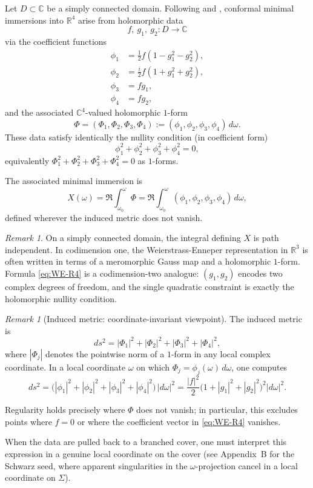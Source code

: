 \documentclass[12pt]{article}
\numberwithin{equation}{section}
\theoremstyle{definition}
\theoremstyle{remark}
\newtheorem{remark}[theorem]{Remark}
\begin{document}
Let $D\subset\mathbb{C}$ be a simply connected domain.
Following \cite{TodaGulerRn} and \cite{TodaGulerR4}, conformal minimal immersions into $\mathbb{R}^4$ arise from holomorphic data
\[
f,\ g_1,\ g_2 : D \longrightarrow \mathbb{C}
\]
via the coefficient functions
\begin{equation}\label{eq:WE-R4}
\begin{aligned}
\phi_1 &= \frac12 f(1 - g_1^2 - g_2^2),\\
\phi_2 &= \frac{i}{2} f(1 + g_1^2 + g_2^2),\\
\phi_3 &= f g_1,\\
\phi_4 &= f g_2 ,
\end{aligned}
\end{equation}
and the associated $\mathbb{C}^4$-valued holomorphic $1$-form
\[
\Phi = (\Phi_1,\Phi_2,\Phi_3,\Phi_4):=(\phi_1,\phi_2,\phi_3,\phi_4)\,d\omega.
\]
These data satisfy identically the nullity condition (in coefficient form)
\[
\phi_1^2+\phi_2^2+\phi_3^2+\phi_4^2=0,
\]
equivalently $\Phi_1^2+\Phi_2^2+\Phi_3^2+\Phi_4^2=0$ as $1$-forms.

The associated minimal immersion is
\[
X(\omega)=\Re\int_{\omega_0}^{\omega}\Phi
=\Re\int_{\omega_0}^{\omega}(\phi_1,\phi_2,\phi_3,\phi_4)\,d\omega,
\]
defined wherever the induced metric does not vanish.

\begin{remark}
On a simply connected domain, the integral defining $X$ is path independent.
In codimension one, the Weierstrass-Enneper representation in $\mathbb{R}^3$ is often written in terms of a meromorphic Gauss map and a holomorphic $1$-form.
Formula \eqref{eq:WE-R4} is a codimension-two analogue: $(g_1,g_2)$ encodes two complex degrees of freedom, and the single quadratic constraint is exactly the holomorphic nullity condition.
\end{remark}

\begin{remark}[Induced metric: coordinate-invariant viewpoint]
The induced metric is
\[
ds^2=|\Phi_1|^2+|\Phi_2|^2+|\Phi_3|^2+|\Phi_4|^2,
\]
where $|\Phi_j|$ denotes the pointwise norm of a $1$-form in any local complex coordinate.
In a local coordinate $\omega$ on which $\Phi_j=\phi_j(\omega)\,d\omega$, one computes
\[
ds^2=\bigl(|\phi_1|^2+|\phi_2|^2+|\phi_3|^2+|\phi_4|^2\bigr)\,|d\omega|^2
=\frac{|f|^2}{2}\bigl(1+|g_1|^2+|g_2|^2\bigr)^2|d\omega|^2.
\]

Regularity holds precisely where $\Phi$ does not vanish; in particular, this excludes points where $f=0$ or where the coefficient vector in \eqref{eq:WE-R4} vanishes.

When the data are pulled back to a branched cover, one must interpret this expression in a genuine local coordinate on the cover (see Appendix~B for the Schwarz seed, where apparent singularities in the $\omega$-projection cancel in a local coordinate on $\Sigma$).
\end{remark}
\end{document}

